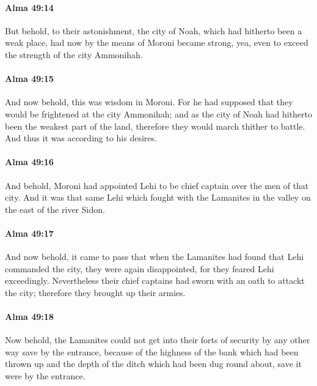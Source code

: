 		\paragraph{Alma 49:14} %
			\label{ALMA-49-14}

			But behold, to their astonishment,
			the city of Noah, which had hitherto been a weak place,
			had now by the means of Moroni became strong,
			yea, even to exceed the strength of the city Ammonihah.

		\paragraph{Alma 49:15} %
			\label{ALMA-49-15}

			And now behold, this was wisdom in Moroni.
			For he had supposed that they would be frightened at the city Ammonihah;
			and as the city of Noah had hitherto been the weakest part of the land,
			therefore they would march thither to battle.
			And thus it was according to his desires.

		\paragraph{Alma 49:16} %
			\label{ALMA-49-16}

			And behold, Moroni had appointed Lehi
			to be chief captain over the men of that city.
			And it was that same Lehi which fought with the Lamanites
			in the valley on the east of the river Sidon.

		\paragraph{Alma 49:17} %
			\label{ALMA-49-17}

			And now behold, it came to pass that
			when the Lamanites had found that Lehi commanded the city,
			they were again disappointed,
			for they feared Lehi exceedingly.
			Nevertheless their chief captains had sworn with an oath to attackt the city;
			therefore they brought up their armies.

		\paragraph{Alma 49:18} %
			\label{ALMA-49-18}

			Now behold, the Lamanites could not get into their forts of security
			by any other way save by the entrance,
			because of the highness of the bank which had been thrown up
			and the depth of the ditch which had been dug round about,
			save it were by the entrance.

